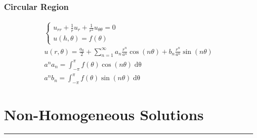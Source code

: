 \documentclass{article}
\begin{document}
\subsubsection*{Circular Region}
\begin{gather*}
\begin{cases}
u_{rr} + \frac{1}{r}u_{r} + \frac{1}{r^{2}}u_{\theta\theta} = 0\\
u(h,\theta)  = f(\theta)
\end{cases}\\
u(r,\theta) = \frac{a_{0}}{2} + \sum_{n=1}^{\infty}a_{n}\frac{r^{n}}{a^{n}}\cos{(n\theta)} + b_{n}\frac{r^{n}}{a^{n}}\sin{(n\theta)}\\
a^{n}a_{n} = \int_{-\pi}^{\pi}f(\theta)\cos{(n\theta)}\mathop{d\theta}\\
a^{n}b_{n} = \int_{-\pi}^{\pi}f(\theta)\sin{(n\theta)}\mathop{d\theta}
\end{gather*}
\newpage




\section{Non-Homogeneous Solutions}
\hrule
\noindent\\
\end{document}
